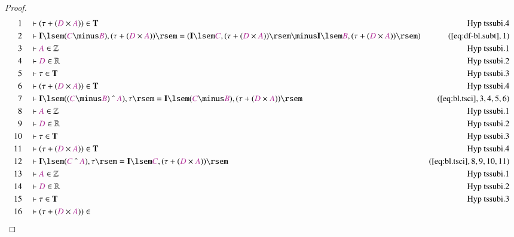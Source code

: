 \begin{proof}
\begin{align}
  1 &&  & \vdash ( \tau + ( \mc{D} \times \mc{A} ) ) \in
      \mathbf{T}&\text{Hyp~tssubi.4}\notag%
  \\ 2 &&  & \vdash \mathbf{I} \lsem ( \mc{C} \minus \mc{B} ) , ( \tau + (
      \mc{D} \times \mc{A} ) ) \rsem = ( \mathbf{I} \lsem
      \mc{C} , ( \tau + ( \mc{D} \times \mc{A} ) ) \rsem
      \minus \mathbf{I} \lsem \mc{B} , ( \tau + ( \mc{D}
      \times \mc{A} ) ) \rsem
      )&(\mbox{\ref{eq:df-bl.subt}},1)\notag
  \\ 3 &&  & \vdash \mc{A} \in \mathbb{Z}&\text{Hyp~tssubi.1}\notag%
  \\ 4 &&  & \vdash \mc{D} \in \mathbb{R}&\text{Hyp~tssubi.2}\notag%
  \\ 5 &&  & \vdash \tau \in \mathbf{T}&\text{Hyp~tssubi.3}\notag%
  \\ 6 &&  & \vdash ( \tau + ( \mc{D} \times \mc{A} ) ) \in
      \mathbf{T}&\text{Hyp~tssubi.4}\notag%
  \\ 7 &&  & \vdash \mathbf{I} \lsem ( ( \mc{C} \minus \mc{B} ) ~\string^~
      \mc{A} ) , \tau \rsem = \mathbf{I} \lsem ( \mc{C}
      \minus \mc{B} ) , ( \tau + ( \mc{D} \times \mc{A} ) )
      \rsem&(\mbox{\ref{eq:bl.tsci}},3,4,5,6)\notag
  \\ 8 &&  & \vdash \mc{A} \in \mathbb{Z}&\text{Hyp~tssubi.1}\notag%
  \\ 9 &&  & \vdash \mc{D} \in \mathbb{R}&\text{Hyp~tssubi.2}\notag%
  \\ 10 &&  & \vdash \tau \in \mathbf{T}&\text{Hyp~tssubi.3}\notag%
  \\ 11 &&  & \vdash ( \tau + ( \mc{D} \times \mc{A} ) ) \in
      \mathbf{T}&\text{Hyp~tssubi.4}\notag%
  \\ 12 &&  & \vdash \mathbf{I} \lsem ( \mc{C} ~\string^~ \mc{A} ) , \tau \rsem
      = \mathbf{I} \lsem \mc{C} , ( \tau + ( \mc{D} \times
      \mc{A} ) )
      \rsem&(\mbox{\ref{eq:bl.tsci}},8,9,10,11)\notag
  \\ 13 &&  & \vdash \mc{A} \in
      \mathbb{Z}&\text{Hyp~tssubi.1}\notag%
  \\ 14 &&  & \vdash \mc{D} \in
      \mathbb{R}&\text{Hyp~tssubi.2}\notag%
  \\ 15 &&  & \vdash \tau \in \mathbf{T}&\text{Hyp~tssubi.3}\notag%
  \\ 16 &&  & \vdash ( \tau + ( \mc{D} \times \mc{A} ) ) \in

\end{align}
\end{proof}
